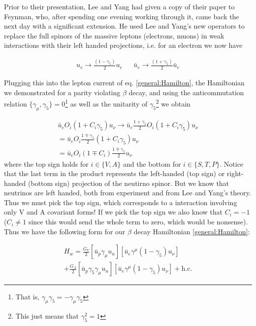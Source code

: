 \documentclass[a4paper,12pt]{book}
\begin{document}
Prior to their presentation, Lee and Yang had given a copy of their paper to Feynman, who, after spending one evening working through it, came back the next day with a significant extension. He used Lee and Yang's new operators to replace the full spinors of the massive leptons (electrons, muons) in weak interactions with their left handed projections, i.e. for an electron we now have

\begin{align}
 u_{e}\rightarrow \frac{\left(1-\gamma_{5}\right)}{2}u_{e} && \bar{u}_{e}\rightarrow \frac{\left(1+\gamma_{5}\right)}{2}\bar{u}_{e}
\end{align}

Plugging this into the lepton current of eq. \ref{general:Hamilton}, the Hamiltonian we demonstrated for a parity violating $\beta$ decay, and using the anticommutation relation $\{\gamma_{\mu},\gamma_{5}\}=0$\footnote{That is, $\gamma_{\mu}\gamma_{5}=-\gamma_{\mu}\gamma_{5}$} as well as the unitarity of $\gamma_{5}$\footnote{This just means that $\gamma_{5}^{2}=1$} we obtain

\begin{align}
 \bar{u}_{e}O_{i}\left(1+C_{i}\gamma_{5}\right)u_{\nu}\rightarrow \bar{u}_{e}\frac{1+\gamma_{5}}{2}O_{i}\left(1+C_{i}\gamma_{5}\right)u_{\nu} \\
=\bar{u}_{e}O_{i}\frac{1\mp\gamma_{5}}{2}\left(1+C_{i}\gamma_{5}\right)u_{\nu} \\
=\bar{u}_{e}O_{i}\left(1\mp C_{i}\right)\frac{1\mp\gamma_{5}}{2}u_{\nu}
\end{align}
where the top sign holds for $i\in\{V, A\}$ and the bottom for $i\in\{S, T, P\}$. Notice that the last term in the product represents the left-handed (top sign) or right-handed (bottom sign) projection of the neutirno spinor. But we know that neutrinos are left handed, both from experiment and from Lee and Yang's theory. Thus we must pick the top sign, which corresponds to a interaction involving only V and A covariant forms! If we pick the top sign we also know that $C_{i}=-1$ ($C_{i}\neq 1$ since this would send the whole term to zero, which would be nonsense). Thus we have the following form for our $\beta$ decay Hamiltonian \ref{general:Hamilton}:

\begin{multline}\label{VandA}
 H_{w}=\frac{G_{V}}{2}\left[\bar{u}_{p}\gamma_{\mu}u_{n}\right]\left[\bar{u}_{e}\gamma^{\mu}\left(1-\gamma_{5}\right)u_{\nu}\right] \\ + \frac{G_{A}}{2}\left[\bar{u}_{p}\gamma_{5}\gamma_{\mu}u_{n}\right]\left[\bar{u}_{e}\gamma^{\mu}\left(1-\gamma_{5}\right)u_{\nu}\right] +\text{h.c.}
\end{multline}
\end{document}
